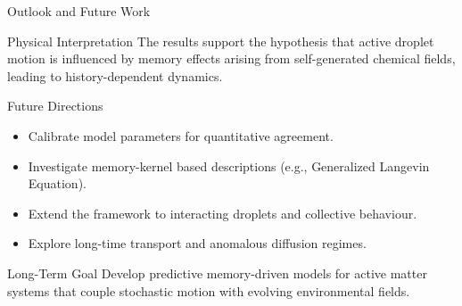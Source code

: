 









\begin{frame}{Outlook and Future Work}

	\begin{block}{Physical Interpretation}
		The results support the hypothesis that active droplet
		motion is influenced by memory effects arising from
		self-generated chemical fields, leading to
		history-dependent dynamics.
	\end{block}

	\begin{block}{Future Directions}
		\begin{itemize}
			\item Calibrate model parameters for quantitative agreement.

			\item Investigate memory-kernel based descriptions
			      (e.g., Generalized Langevin Equation).

			\item Extend the framework to interacting droplets
			      and collective behaviour.

			\item Explore long-time transport and anomalous
			      diffusion regimes.
		\end{itemize}
	\end{block}

	\begin{alertblock}{Long-Term Goal}
		Develop predictive memory-driven models for active matter
		systems that couple stochastic motion with evolving
		environmental fields.
	\end{alertblock}

\end{frame}

